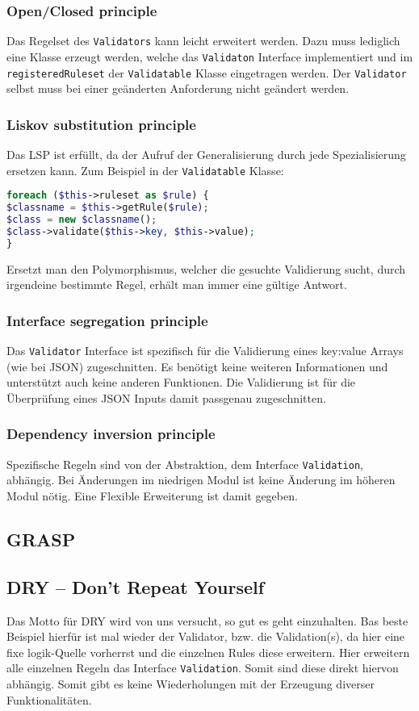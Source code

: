 \documentclass[12pt,a4paper,titlepage,ngerman,pdftex]{report}
\begin{document}
    \subsubsection{Open/Closed principle}
    Das Regelset des \verb|Validators| kann leicht erweitert werden. Dazu muss lediglich eine Klasse erzeugt werden, welche das \verb|Validaton| Interface implementiert und im \verb|registeredRuleset| der \verb|Validatable| Klasse eingetragen werden. Der \verb|Validator| selbst muss bei einer geänderten Anforderung nicht geändert werden.
    \subsubsection{Liskov substitution principle}
    Das LSP ist erfüllt, da der Aufruf der Generalisierung durch jede Spezialisierung ersetzen kann. Zum Beispiel in der \verb|Validatable| Klasse:
    \begin{lstlisting}[language=php,label={lst:lsp},escapechar=\%]
foreach ($this->ruleset as $rule) {
$classname = $this->getRule($rule);
$class = new $classname();
$class->validate($this->key, $this->value);
}
    \end{lstlisting}
	Ersetzt man den Polymorphismus, welcher die gesuchte Validierung sucht, durch irgendeine bestimmte Regel, erhält man immer eine gültige Antwort.
    \subsubsection{Interface segregation principle}
    Das \verb|Validator| Interface ist spezifisch für die Validierung eines key:value Arrays (wie bei JSON) zugeschnitten. Es benötigt keine weiteren Informationen und unterstützt auch keine anderen Funktionen. Die Validierung ist für die Überprüfung eines JSON Inputs damit passgenau zugeschnitten. 
    \subsubsection{Dependency inversion principle}
    Spezifische Regeln sind von der Abstraktion, dem Interface \verb|Validation|, abhängig. Bei Änderungen im niedrigen Modul ist keine Änderung im höheren Modul nötig. Eine Flexible Erweiterung ist damit gegeben.
    \subsection{GRASP}
    \label{subsec:grasp}
    
    \subsection{DRY -- Don't Repeat Yourself}
    \label{subsec:dry}
    Das Motto für DRY wird von uns versucht, so gut es geht einzuhalten.
    Bas beste Beispiel hierfür ist mal wieder der Validator, bzw. die Validation(s), da hier eine fixe logik-Quelle vorherrst und die einzelnen Rules diese erweitern.
    Hier erweitern alle einzelnen Regeln das Interface \verb|Validation|.
    Somit sind diese direkt hiervon abhängig.
    Somit gibt es keine Wiederholungen mit der Erzeugung diverser Funktionalitäten.
\end{document}
